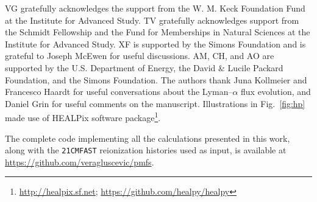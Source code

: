 \acknowledgements

VG gratefully acknowledges the support from the W. M. Keck Foundation Fund at the Institute for Advanced Study. TV gratefully acknowledges support from the Schmidt Fellowship and the Fund for Memberships in Natural Sciences at the Institute for Advanced Study. XF is supported by the Simons Foundation and is grateful to Joseph McEwen for useful discussions. AM, CH, and AO are supported by the U.S. Department of Energy, the David \& Lucile Packard Foundation, and the Simons Foundation. The authors thank Juna Kollmeier and Francesco Haardt for useful conversations about the Lyman--$\alpha$ flux evolution, and Daniel Grin for useful comments on the manuscript. Illustrations in Fig.~\ref{fig:hp} made use of HEALPix \cite{2005ApJ...622..759G} software package\footnote{\url{ http://healpix.sf.net}; \url{https://github.com/healpy/healpy}}. 

The complete code implementing all the calculations presented in this work, along with the \texttt{21CMFAST} reionization histories used as input, is available at \url{https://github.com/veragluscevic/pmfs}.